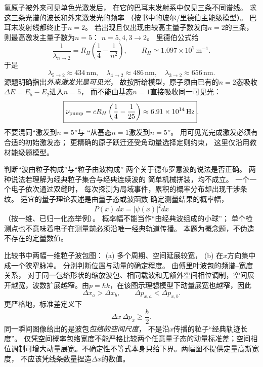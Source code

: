 \problemtext 氢原子被外来可见单色光激发后，
在它的巴耳末发射系中仅见三条不同谱线。
求这三条光谱的波长和外来激发光的频率
（按书中的玻尔/里德伯主能级模型）。
\workings
巴耳末发射线都终止于$n=2$。
若出现且仅出现由较高主量子数发向$n=2$的三条，
则最高激发主量子数为$n=5$：
$n=5,4,3\to2$。
里德伯公式给
\[
 \frac1{\lambda_{n\to2}}=
 R_H\left(\frac14-\frac1{n^2}\right),
 \qquad R_H\simeq1.097\times10^7\,\mathrm{m^{-1}}.
\]
于是
\[
 \boxed{\lambda_{5\to2}\approx434\,\mathrm{nm}},\quad
 \boxed{\lambda_{4\to2}\approx486\,\mathrm{nm}},\quad
 \boxed{\lambda_{3\to2}\approx656\,\mathrm{nm}}.
\]
源题明确指出\emph{外来激发光是可见光}，
故按所给模型，原子须由已有的$n=2$态吸收
$\Delta E=E_5-E_2$进入$n=5$，
而不能由基态$n=1$直接吸收同一可见光：
\[
 \boxed{\nu_{\rm pump}
 =cR_H\left(\frac14-\frac1{25}\right)
 \approx6.91\times10^{14}\,\mathrm{Hz}}.
\]
\crosscheck 不要混同“激发到$n=5$”与
“从基态$n=1$激发到$n=5$”。
用可见光完成激发必须有合适的初始激发态；
更精确的原子跃迁还受角动量选择定则约束，
这里仅沿用教材能级题模型。

\problemtext 判断“波由粒子构成”与“粒子由波构成”
两个关于德布罗意波的说法是否正确。
\workings
两种说法若理解为经典粒子集合与经典连续波的
简单机械拼装，均不成立。
一个一个电子依次通过双缝时，
每次探测为局域事件，累积的概率分布却出现干涉条纹。
适宜的量子理论表述是由量子态或波函数
确定测量结果的概率幅，
\[
 \boxed{P(x)\,dx=|\psi(x)|^2dx}
\]
（按一维、已归一化态举例）。
\crosscheck 概率幅不能当作“由经典波组成的小球”；
单个检测点也不意味着电子在测量前必须沿唯一经典轨道传播。
本题为概念题，不伪造不存在的定量数值。

\problemtext 比较书中两幅一维粒子波包图：
(a) 多个周期、空间延展较宽，
(b) 在$x$方向集中成一个狭窄脉冲。
分别判断位置与动量的确定程度。
\workings
由傅里叶波包的频谱--宽度关系，
对于同一包络形状的缩放波包、相同载波和无额外空间相位调制，空间展开越宽，波数扩展越窄。由$p=\hbar k$，在该图示理想模型下动量展宽也越窄，因此
\[
 \boxed{\Delta x_a>\Delta x_b},\qquad
 \boxed{\Delta p_{x,a}<\Delta p_{x,b}}.
\]
更严格地，标准差定义下
\[
 \boxed{\Delta x\,\Delta p_x\ge\frac{\hbar}{2}}.
\]
\crosscheck 同一瞬间图像给出的是波包\emph{包络的空间尺度}，
不是沿$x$传播的粒子“经典轨迹长度”。
仅凭空间概率包络宽度不能严格比较两个任意量子态的动量标准差；空间相位调制可增大动量展宽。不确定性不等式本身只给下界。两幅图不提供定量高斯宽度，
不应该凭线条数量捏造$\Delta x$的数值。

